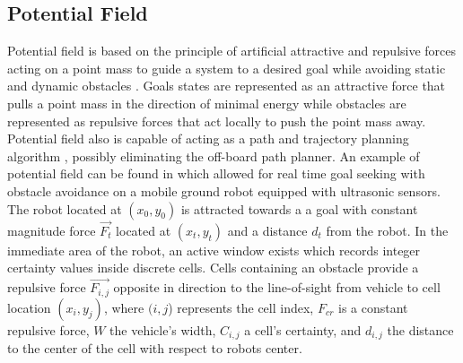 \documentclass[conf]{new-aiaa}
\begin{document}
%
%
%


\subsection{Potential Field}

Potential field is based on the principle of artificial attractive and repulsive forces acting on a point mass to guide a system to a desired goal while avoiding static and dynamic obstacles \cite{khatib_real-time_1986}. Goals states are represented as an attractive force that pulls a point mass in the direction of minimal energy while obstacles are represented as repulsive forces that act locally to push the point mass away. Potential field also is capable of acting as a path and trajectory planning algorithm \cite{rimon_exact_1992}, possibly eliminating the off-board path planner. An example of potential field can be found in \cite{borenstein_real-time_1990,borenstein_vector_1991,koren_potential_1991} which allowed for real time goal seeking with obstacle avoidance on a mobile ground robot equipped with ultrasonic sensors. The robot located at $(x_0,y_0)$ is attracted towards a a goal with constant magnitude force $\overrightarrow{F_t}$ located at $(x_t,y_t)$ and a distance $d_t$ from the robot. In the immediate area of the robot, an active window exists which records integer certainty values inside discrete cells. Cells containing an obstacle provide a repulsive force $\overrightarrow{F_{i,j}}$ opposite in direction to the line-of-sight from vehicle to cell location $(x_i,y_j)$, where $(i,j$) represents the cell index, $F_{cr}$ is a constant repulsive force, $W$ the vehicle's width, $C_{i,j}$ a cell's certainty, and $d_{i,j}$ the distance to the center of the cell with respect to robots center.
\end{document}
